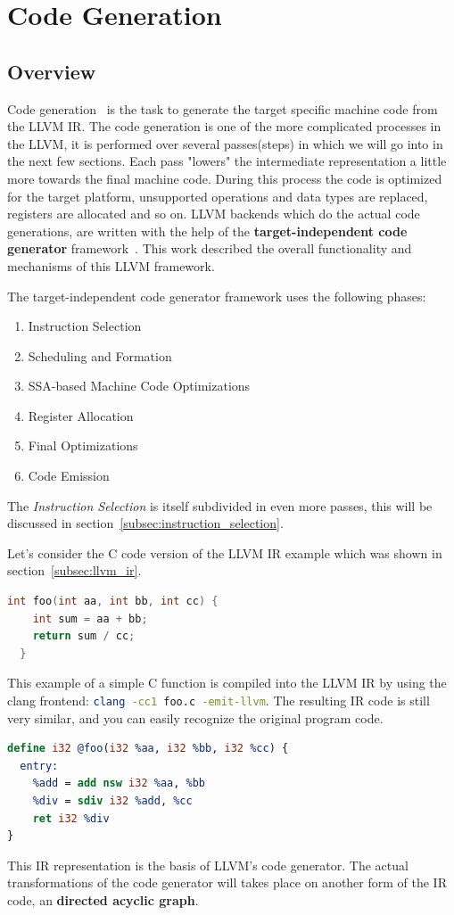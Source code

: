 \section{Code Generation}
\label{sec:codegen}

\subsection{Overview}

Code generation~\cite{llvm:backend} is the task to generate the target specific machine code from the LLVM IR.
The code generation is one of the more complicated processes in the LLVM, it is performed
over several passes(steps) in which we will go into in the next few sections. Each pass "lowers"
the intermediate representation a little more towards the final machine code. During this process
the code is optimized for the target platform, unsupported operations and data types are replaced,
registers are allocated and so on. LLVM backends which do the actual code generations, are written
with the help of the \textbf{target-independent code generator} framework~\cite{llvm:targetindependent}. 
This work described the overall functionality and mechanisms of this LLVM framework.

The target-independent code generator framework uses the following phases:
\begin{enumerate}
  \item Instruction Selection
  \item Scheduling and Formation
  \item SSA-based Machine Code Optimizations
  \item Register Allocation
  \item Final Optimizations
  \item Code Emission
\end{enumerate}
The \textit{Instruction Selection} is itself subdivided in even more passes, this will be discussed 
in section~\ref{subsec:instruction_selection}.

Let's consider the C code version of the LLVM IR example which was shown in section~\ref{subsec:llvm_ir}.
\begin{lstlisting}[language=C]
  int foo(int aa, int bb, int cc) {
    int sum = aa + bb;
    return sum / cc;
  }
\end{lstlisting}
This example of a simple C function is compiled into the LLVM IR by using the clang frontend: 
\lstinline[language=bash]{clang -cc1 foo.c -emit-llvm}. 
The resulting IR code is still very similar, and you can easily recognize the original program code.
\begin{lstlisting}[language=LLVM,label={lst:llvm_simple}]
define i32 @foo(i32 %aa, i32 %bb, i32 %cc) {
  entry:
    %add = add nsw i32 %aa, %bb
    %div = sdiv i32 %add, %cc
    ret i32 %div
}
\end{lstlisting}
This IR representation is the basis of LLVM's code generator. The actual transformations of the code generator
will takes place on another form of the IR code, an \textbf{directed acyclic graph}.


